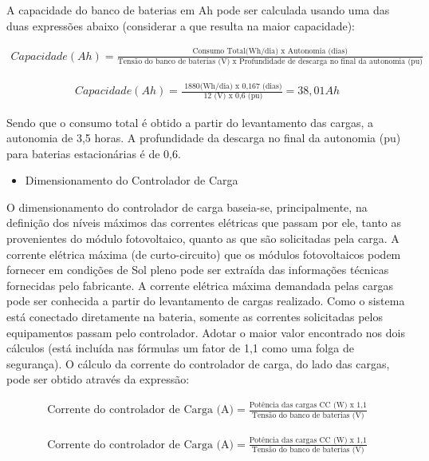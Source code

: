 A capacidade do banco de baterias em Ah pode ser calculada usando uma das duas expressões abaixo (considerar a que resulta na maior capacidade):

\begin{eqnarray}
Capacidade (Ah) = \frac{\text{Consumo Total(Wh/dia) x Autonomia (dias)} }{\text{Tensão do banco de baterias (V) x Profundidade de descarga no final da autonomia (pu)}}
\end{eqnarray}

\begin{eqnarray}
Capacidade (Ah) = \frac{\text{ 1880(Wh/dia) x 0,167 (dias)} }{\text{ 12 (V) x 0,6 (pu)}} =  38,01 Ah
\end{eqnarray}

Sendo que o consumo total é obtido a partir do levantamento das cargas, a autonomia de 3,5 horas. A profundidade da descarga no final da autonomia (pu) para baterias estacionárias é de 0,6.

\begin{itemize}
\item Dimensionamento do Controlador de Carga
\end{itemize}

		O dimensionamento do controlador de carga baseia-se, principalmente, na definição dos níveis máximos das correntes elétricas que passam por ele, tanto as provenientes do módulo fotovoltaico, quanto as que são solicitadas pela carga. A corrente elétrica máxima (de curto-circuito) que os módulos fotovoltaicos podem fornecer em condições de Sol pleno pode ser extraída das informações técnicas fornecidas pelo fabricante. A corrente elétrica máxima demandada pelas cargas pode ser conhecida a partir do levantamento de cargas realizado. Como o sistema está conectado diretamente na bateria, somente as correntes solicitadas pelos equipamentos passam pelo controlador. Adotar o maior valor encontrado nos dois cálculos (está incluída nas fórmulas um fator de 1,1 como uma folga de segurança).
        O cálculo da corrente do controlador de carga, do lado das cargas, pode ser obtido através da expressão:

\begin{eqnarray}
\text{Corrente do controlador de Carga (A)} = \frac{\text{Potência das cargas CC (W) x 1,1}}{\text{Tensão do banco de baterias (V)}}
\end{eqnarray}

\begin{eqnarray}
\text{Corrente do controlador de Carga (A)} = \frac{\text{Potência das cargas CC (W) x 1,1}}{\text{Tensão do banco de baterias (V)}}
\end{eqnarray}

